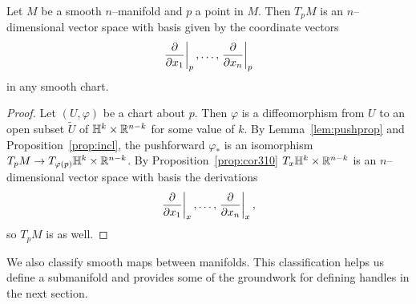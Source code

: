\begin{lem}
	Let $M$ be a smooth $n$--manifold and $p$ a point in $M$.
	Then $T_p M$ is an $n$--dimensional vector space with basis given by the coordinate vectors
	\[
		\left.\frac{\partial}{\partial x_1}\right|_{p}, \dots,	\left.\frac{\partial}{\partial x_n}\right|_{p}
	\]	
	in any smooth chart.
\end{lem}

\begin{proof}
	Let $(U,\varphi)$ be a chart about $p$.
	Then $\varphi$ is a diffeomorphism from $U$ to an open subset $\tilde{U}$ of $\mathbb{H}^k\times\mathbb{R}^{n-k}$ for some value of $k$. 
	By Lemma~\ref{lem:pushprop} and Proposition~\ref{prop:incl}, the pushforward $\varphi_*$ is an isomorphism $T_p M\to T_{\varphi(p)}\mathbb{H}^k\times\mathbb{R}^{n-k}$.
	By Proposition~\ref{prop:cor310} $T_x\mathbb{H}^k\times\mathbb{R}^{n-k}$ is an $n$--dimensional vector space with basis the derivations
	\[
		\left.\frac{\partial}{\partial x_1}\right|_{x}, \dots, \left.\frac{\partial}{\partial x_n}\right|_{x},
	\]
	so $T_p M$ is as well.
\end{proof}

We also classify smooth maps between manifolds.
This classification helps us define a submanifold and provides some of the groundwork for defining handles in the next section.

